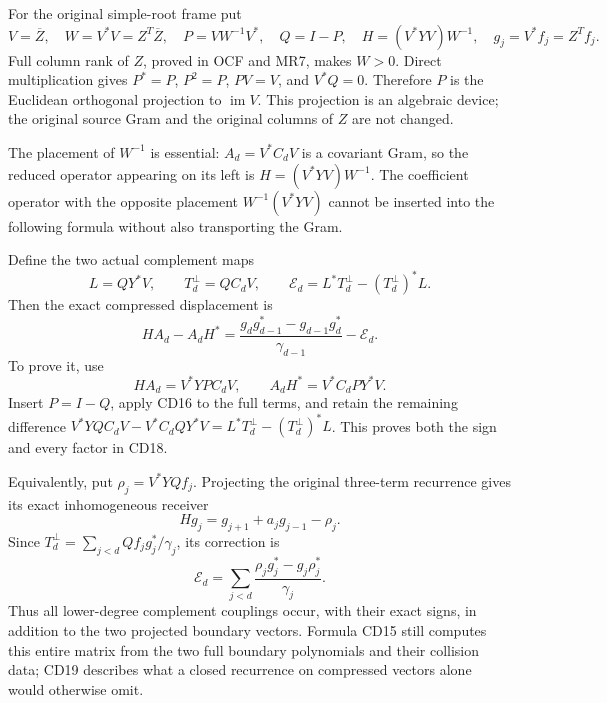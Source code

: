 \documentclass[11pt]{article}
\begin{document}
For the original simple-root frame put
\[
 V=\overline Z,\quad W=V^*V=Z^T\overline Z,\quad
 P=VW^{-1}V^*,\quad Q=I-P,\quad
 H=(V^*YV)W^{-1},\quad g_j=V^*f_j=Z^Tf_j.
\]
Full column rank of \(Z\), proved in OCF and MR7, makes \(W>0\).
Direct multiplication gives \(P^*=P\), \(P^2=P\),
\(PV=V\), and \(V^*Q=0\). Therefore \(P\) is the Euclidean
orthogonal projection to \(\operatorname{im}V\). This projection is
an algebraic device; the original source Gram and the original columns
of \(Z\) are not changed.

The placement of \(W^{-1}\) is essential: \(A_d=V^*C_dV\) is a
covariant Gram, so the reduced operator appearing on its left is
\(H=(V^*YV)W^{-1}\). The coefficient operator with the opposite
placement \(W^{-1}(V^*YV)\) cannot be inserted into the following
formula without also transporting the Gram.

Define the two actual complement maps
\[
 L=QY^*V,\qquad T_d^{\perp}=QC_dV,\qquad
 \mathcal E_d=L^*T_d^{\perp}-(T_d^{\perp})^*L.
\]
Then the exact compressed displacement is
\begin{equation}\label{eq:compressed-displacement}
 \boxed{HA_d-A_dH^*=
 \frac{g_dg_{d-1}^*-g_{d-1}g_d^*}{\gamma_{d-1}}
   -\mathcal E_d.}
 \tag{CD18}
\end{equation}
To prove it, use
\[
 HA_d=V^*YPC_dV,\qquad A_dH^*=V^*C_dPY^*V.
\]
Insert \(P=I-Q\), apply CD16 to the full terms, and retain the
remaining difference
\(V^*YQC_dV-V^*C_dQY^*V=L^*T_d^\perp-(T_d^\perp)^*L\).
This proves both the sign and every factor in CD18.

Equivalently, put \(\rho_j=V^*YQf_j\). Projecting the original
three-term recurrence gives its exact inhomogeneous receiver
\[
 Hg_j=g_{j+1}+a_jg_{j-1}-\rho_j.
\]
Since \(T_d^\perp=\sum_{j<d}Qf_jg_j^*/\gamma_j\), its correction is
\begin{equation}\label{eq:correction-sum}
 \mathcal E_d=\sum_{j<d}
    \frac{\rho_jg_j^*-g_j\rho_j^*}{\gamma_j}.
 \tag{CD19}
\end{equation}
Thus all lower-degree complement couplings occur, with their exact
signs, in addition to the two projected boundary vectors. Formula CD15
still computes this entire matrix from the two full boundary
polynomials and their collision data; CD19 describes what a closed
recurrence on compressed vectors alone would otherwise omit.
\end{document}

